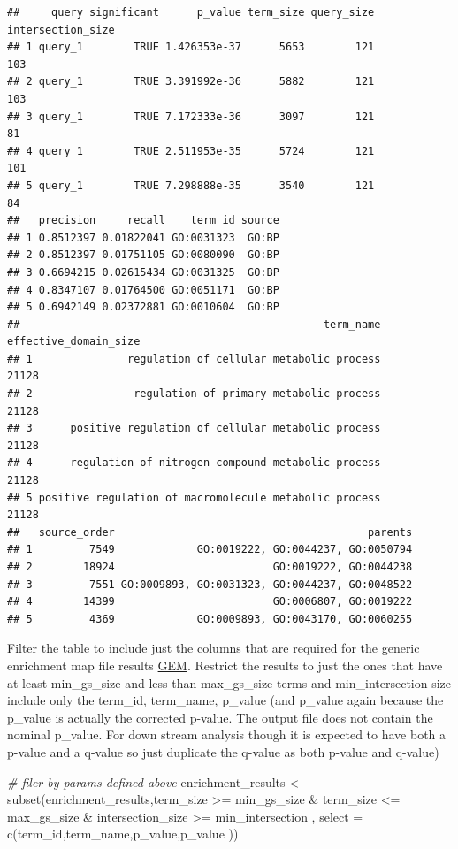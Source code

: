 \documentclass[
]{book}
\newenvironment{Shaded}{\begin{snugshade}}{\end{snugshade}}
\newcommand{\AttributeTok}[1]{\textcolor[rgb]{0.77,0.63,0.00}{#1}}
\newcommand{\CommentTok}[1]{\textcolor[rgb]{0.56,0.35,0.01}{\textit{#1}}}
\newcommand{\FunctionTok}[1]{\textcolor[rgb]{0.00,0.00,0.00}{#1}}
\newcommand{\NormalTok}[1]{#1}
\newcommand{\OtherTok}[1]{\textcolor[rgb]{0.56,0.35,0.01}{#1}}
\newcommand{\SpecialCharTok}[1]{\textcolor[rgb]{0.00,0.00,0.00}{#1}}
\begin{document}
\begin{verbatim}
##     query significant      p_value term_size query_size intersection_size
## 1 query_1        TRUE 1.426353e-37      5653        121               103
## 2 query_1        TRUE 3.391992e-36      5882        121               103
## 3 query_1        TRUE 7.172333e-36      3097        121                81
## 4 query_1        TRUE 2.511953e-35      5724        121               101
## 5 query_1        TRUE 7.298888e-35      3540        121                84
##   precision     recall    term_id source
## 1 0.8512397 0.01822041 GO:0031323  GO:BP
## 2 0.8512397 0.01751105 GO:0080090  GO:BP
## 3 0.6694215 0.02615434 GO:0031325  GO:BP
## 4 0.8347107 0.01764500 GO:0051171  GO:BP
## 5 0.6942149 0.02372881 GO:0010604  GO:BP
##                                                term_name effective_domain_size
## 1               regulation of cellular metabolic process                 21128
## 2                regulation of primary metabolic process                 21128
## 3      positive regulation of cellular metabolic process                 21128
## 4      regulation of nitrogen compound metabolic process                 21128
## 5 positive regulation of macromolecule metabolic process                 21128
##   source_order                                        parents
## 1         7549             GO:0019222, GO:0044237, GO:0050794
## 2        18924                         GO:0019222, GO:0044238
## 3         7551 GO:0009893, GO:0031323, GO:0044237, GO:0048522
## 4        14399                         GO:0006807, GO:0019222
## 5         4369             GO:0009893, GO:0043170, GO:0060255
\end{verbatim}

Filter the table to include just the columns that are required for the generic enrichment map file results \href{https://enrichmentmap.readthedocs.io/en/latest/FileFormats.html\#generic-results-files}{GEM}. Restrict the results to just the ones that have at least min\_gs\_size and less than max\_gs\_size terms and min\_intersection size include only the term\_id, term\_name, p\_value (and p\_value again because the p\_value is actually the corrected p-value. The output file does not contain the nominal p\_value. For down stream analysis though it is expected to have both a p-value and a q-value so just duplicate the q-value as both p-value and q-value)

\begin{Shaded}
\begin{Highlighting}[]
\CommentTok{\# filer by params defined above}
\NormalTok{enrichment\_results }\OtherTok{\textless{}{-}} \FunctionTok{subset}\NormalTok{(enrichment\_results,term\_size }\SpecialCharTok{\textgreater{}=}\NormalTok{ min\_gs\_size }\SpecialCharTok{\&} 
\NormalTok{                                   term\_size }\SpecialCharTok{\textless{}=}\NormalTok{ max\_gs\_size }\SpecialCharTok{\&} 
\NormalTok{                                   intersection\_size }\SpecialCharTok{\textgreater{}=}\NormalTok{ min\_intersection , }
                                 \AttributeTok{select =} \FunctionTok{c}\NormalTok{(term\_id,term\_name,p\_value,p\_value ))}
\end{Highlighting}
\end{Shaded}
\end{document}
